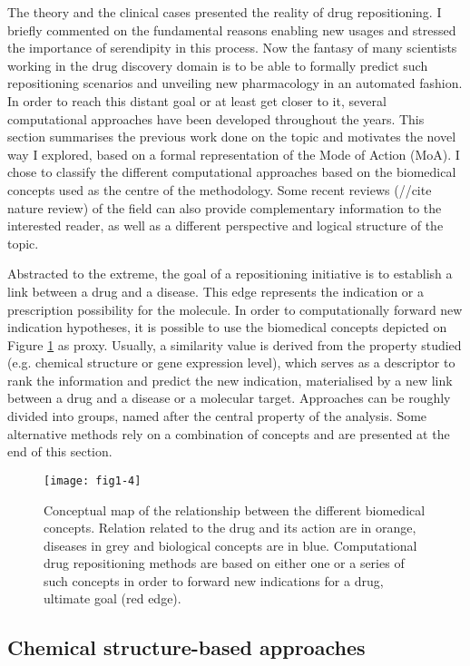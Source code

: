 The theory and the clinical cases presented the reality of drug repositioning. I briefly commented on the fundamental reasons enabling new usages and stressed the importance of serendipity in this process. Now the fantasy of many scientists working in the drug discovery domain is to be able to formally predict such repositioning scenarios and unveiling new pharmacology in an automated fashion. In order to reach this distant goal or at least get closer to it, several computational approaches have been developed throughout the years. This section summarises the previous work done on the topic and motivates the novel way I explored, based on a formal representation of the Mode of Action (MoA). I chose to classify the different computational approaches based on the biomedical concepts used as the centre of the methodology. Some recent reviews (//cite nature review) \citep{dudley2011exploiting} \citep{hurle2013computational} of the field can also provide complementary information to the interested reader, as well as a different perspective and logical structure of the topic.

Abstracted to the extreme, the goal of a repositioning initiative is to establish a link between a drug and a disease. This edge represents the indication or a prescription possibility for the molecule. In order to computationally forward new indication hypotheses, it is possible to use the biomedical concepts depicted on Figure \ref{fig1-4} as proxy. Usually, a similarity value is derived from the property studied (e.g. chemical structure or gene expression level), which serves as a descriptor to rank the information and predict the new indication, materialised by a new link between a drug and a disease or a molecular target. Approaches can be roughly divided into groups, named after the central property of the analysis. Some alternative methods rely on a combination of concepts and are presented at the end of this section.

\begin{figure}[ht]
    \centering
    \texttt{[image: fig1-4]}
    \caption{Conceptual map of the relationship between the different biomedical concepts. Relation related to the drug and its action are in orange, diseases in grey and biological concepts are in blue. Computational drug repositioning methods are based on either one or a series of such concepts in order to forward new indications for a drug, ultimate goal (red edge).}
    \label{fig1-4}
\end{figure}

\subsection{Chemical structure-based approaches}

